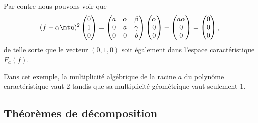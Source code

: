 \begin{remark}
    Par contre nous pouvons voir que
    \begin{equation}
        (f-\alpha\mtu)^2\begin{pmatrix}
             0   \\ 
            1    \\ 
            0    
        \end{pmatrix}=
        \begin{pmatrix}
            a    &   \alpha    &   \beta    \\
            0    &   a    &   \gamma    \\
            0    &   0    &   b
        \end{pmatrix}
        \begin{pmatrix}
            \alpha    \\ 
            0    \\ 
            0    
        \end{pmatrix}-\begin{pmatrix}
            a\alpha    \\ 
            0    \\ 
            0    
        \end{pmatrix}=\begin{pmatrix}
            0    \\ 
            0    \\ 
            0    
        \end{pmatrix},
    \end{equation}
    de telle sorte que le vecteur \( (0,1,0)\) soit également dans l'espace caractéristique \( F_a(f)\).

    Dans cet exemple, la multiplicité algébrique de la racine \( a\) du polynôme caractéristique vaut \( 2\) tandis que sa multiplicité géométrique vaut seulement \( 1\).
\end{remark}

\subsection{Théorèmes de décomposition}


